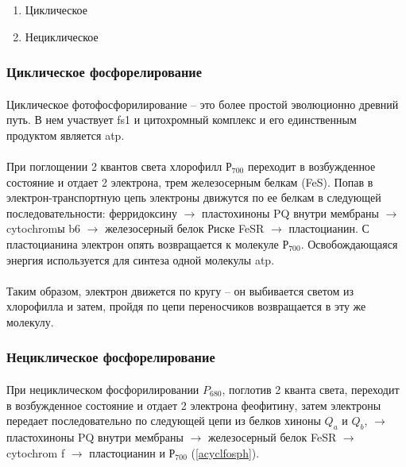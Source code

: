 \begin{enumerate}
	\item Циклическое
	\item Нециклическое
\end{enumerate}

\subsubsection*{Циклическое фосфорелирование}

\paragraph*{}Циклическое фотофосфорилирование -- это более простой эволюционно древний путь. В нем участвует \gls{fs1} и цитохромный комплекс и его единственным продуктом является \gls{atp}.

\paragraph*{}При поглощении 2 квантов света хлорофилл $Р_{700}$ переходит в возбужденное состояние и отдает 2 электрона, трем железосерным белкам (FeS). Попав в электрон-транспортную цепь электроны движутся по ее белкам в следующей последовательности: ферридоксину $\rightarrow$ пластохиноны PQ внутри мембраны $\rightarrow$ \gls{cytochrom}ы b6 $\rightarrow$ железосерный белок Риске FeSR $\rightarrow$ пластоцианин. С пластоцианина электрон опять возвращается к молекуле $Р_{700}$. Освобождающаяся энергия используется для синтеза одной молекулы \gls{atp}.

\paragraph*{}Таким образом, электрон движется по кругу -- он выбивается светом из хлорофилла и затем, пройдя по цепи переносчиков возвращается в эту же молекулу.

\subsubsection*{Нециклическое фосфорелирование}

\paragraph*{}При нециклическом фосфорилировании $P_{680}$, поглотив 2 кванта света, переходит в возбужденное состояние и отдает 2 электрона феофитину, затем электроны передает последовательно по следующей цепи из белков хиноны $Q_{a}$ и $Q_{b}$, $\rightarrow$ пластохиноны PQ внутри мембраны $\rightarrow$ железосерный белок FeSR $\rightarrow$ \gls{cytochrom} f $\rightarrow$ пластоцианин и $Р_{700}$ (\ris \ref{acyclfosph}).

